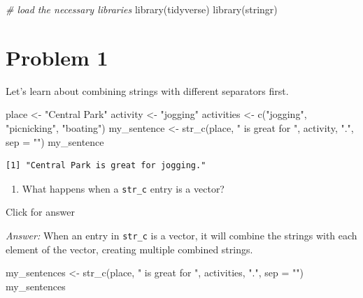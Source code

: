 \documentclass[
]{book}
\newenvironment{Shaded}{\begin{snugshade}}{\end{snugshade}}
\newcommand{\AttributeTok}[1]{\textcolor[rgb]{0.77,0.63,0.00}{#1}}
\newcommand{\CommentTok}[1]{\textcolor[rgb]{0.56,0.35,0.01}{\textit{#1}}}
\newcommand{\FunctionTok}[1]{\textcolor[rgb]{0.00,0.00,0.00}{#1}}
\newcommand{\NormalTok}[1]{#1}
\newcommand{\OtherTok}[1]{\textcolor[rgb]{0.56,0.35,0.01}{#1}}
\newcommand{\StringTok}[1]{\textcolor[rgb]{0.31,0.60,0.02}{#1}}
\providecommand{\tightlist}{%
  \setlength{\itemsep}{0pt}\setlength{\parskip}{0pt}}
\begin{document}
\begin{Shaded}
\begin{Highlighting}[]
\CommentTok{\# load the necessary libraries}
\FunctionTok{library}\NormalTok{(tidyverse)}
\FunctionTok{library}\NormalTok{(stringr)}
\end{Highlighting}
\end{Shaded}

\hypertarget{problem-1}{%
\section{Problem 1}\label{problem-1}}

Let's learn about combining strings with different separators first.

\begin{Shaded}
\begin{Highlighting}[]
\NormalTok{place }\OtherTok{\textless{}{-}} \StringTok{"Central Park"}
\NormalTok{activity }\OtherTok{\textless{}{-}} \StringTok{"jogging"}
\NormalTok{activities }\OtherTok{\textless{}{-}} \FunctionTok{c}\NormalTok{(}\StringTok{"jogging"}\NormalTok{, }\StringTok{"picnicking"}\NormalTok{, }\StringTok{"boating"}\NormalTok{)}
\NormalTok{my\_sentence }\OtherTok{\textless{}{-}} \FunctionTok{str\_c}\NormalTok{(place, }\StringTok{" is great for "}\NormalTok{, activity, }\StringTok{"."}\NormalTok{, }\AttributeTok{sep =} \StringTok{""}\NormalTok{)}
\NormalTok{my\_sentence}
\end{Highlighting}
\end{Shaded}

\begin{verbatim}
[1] "Central Park is great for jogging."
\end{verbatim}

\begin{enumerate}
\def\labelenumi{\alph{enumi}.}
\tightlist
\item
  What happens when a \texttt{str\_c} entry is a vector?
\end{enumerate}

Click for answer

\emph{Answer:} When an entry in \texttt{str\_c} is a vector, it will combine the strings with each element of the vector, creating multiple combined strings.

\begin{Shaded}
\begin{Highlighting}[]
\NormalTok{my\_sentences }\OtherTok{\textless{}{-}} \FunctionTok{str\_c}\NormalTok{(place, }\StringTok{" is great for "}\NormalTok{, activities, }\StringTok{"."}\NormalTok{, }\AttributeTok{sep =} \StringTok{""}\NormalTok{)}
\NormalTok{my\_sentences}
\end{Highlighting}
\end{Shaded}
\end{document}
